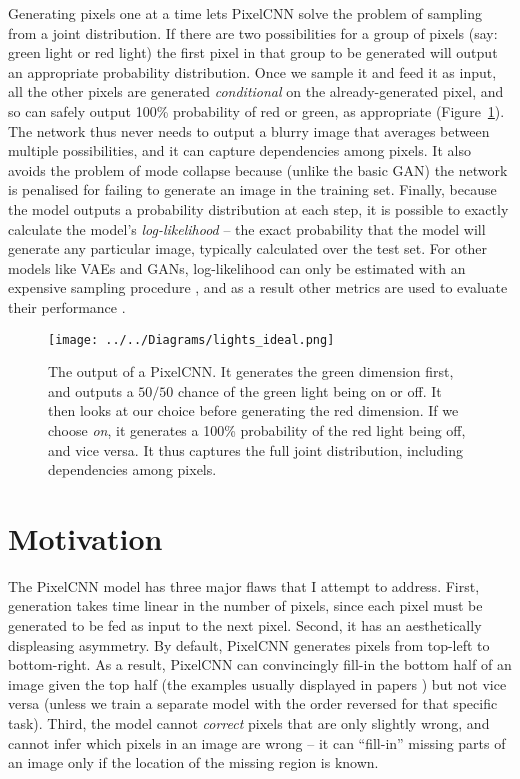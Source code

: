 \documentclass[11pt, a4paper, openany]{book}
\newcommand{\nquote}[1]{``{#1}''}
\begin{document}
Generating pixels one at a time lets PixelCNN solve the problem of sampling from a joint distribution. If there are two possibilities for a group of pixels (say: green light or red light) the first pixel in that group to be generated will output an appropriate probability distribution. Once we sample it and feed it as input, all the other pixels are generated \emph{conditional} on the already-generated pixel, and so can safely output 100\% probability of red or green, as appropriate (Figure~\ref{lightsideal}). The network thus never needs to output a blurry image that averages between multiple possibilities, and it can capture dependencies among pixels. It also avoids the problem of mode collapse because (unlike the basic GAN) the network is penalised for failing to generate an image in the training set. Finally, because the model outputs a probability distribution at each step, it is possible to exactly calculate the model's \emph{log-likelihood} -- the exact probability that the model will generate any particular image, typically calculated over the test set. For other models like VAEs and GANs, log-likelihood can only be estimated with an expensive sampling procedure \citep{likelihoodestimation}, and as a result other metrics are used to evaluate their performance \citep{ganmetrics}.

\begin{figure}
  \centering
  \texttt{[image: ../../Diagrams/lights\_ideal.png]}
  \caption[Output of a PixelCNN]{The output of a PixelCNN. It generates the green dimension first, and outputs a $50/50$ chance of the green light being on or off. It then looks at our choice before generating the red dimension. If we choose \emph{on}, it generates a 100\% probability of the red light being off, and vice versa. It thus captures the full joint distribution, including dependencies among pixels.}
  \label{lightsideal}
\end{figure}

\section{Motivation}

The PixelCNN model has three major flaws that I attempt to address. First, generation takes time linear in the number of pixels, since each pixel must be generated to be fed as input to the next pixel. Second, it has an aesthetically displeasing asymmetry. By default, PixelCNN generates pixels from top-left to bottom-right. As a result, PixelCNN can convincingly fill-in the bottom half of an image given the top half (the examples usually displayed in papers \citep{pixelcnn1,quantile}) but not vice versa (unless we train a separate model with the order reversed for that specific task). Third, the model cannot \emph{correct} pixels that are only slightly wrong, and cannot infer which pixels in an image are wrong -- it can \nquote{fill-in} missing parts of an image only if the location of the missing region is known.
\end{document}
